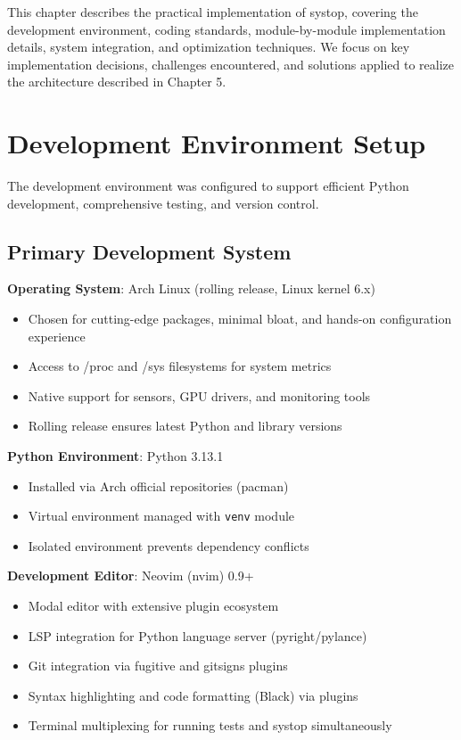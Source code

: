 \documentclass[12pt,a4paper,oneside]{report}
\begin{document}
This chapter describes the practical implementation of systop, covering the development environment, coding standards, module-by-module implementation details, system integration, and optimization techniques. We focus on key implementation decisions, challenges encountered, and solutions applied to realize the architecture described in Chapter 5.

\section{Development Environment Setup}
\label{sec:dev-environment}

The development environment was configured to support efficient Python development, comprehensive testing, and version control.

\subsection{Primary Development System}

\textbf{Operating System}: Arch Linux (rolling release, Linux kernel 6.x)
\begin{itemize}
    \item Chosen for cutting-edge packages, minimal bloat, and hands-on configuration experience
    \item Access to /proc and /sys filesystems for system metrics
    \item Native support for sensors, GPU drivers, and monitoring tools
    \item Rolling release ensures latest Python and library versions
\end{itemize}

\textbf{Python Environment}: Python 3.13.1
\begin{itemize}
    \item Installed via Arch official repositories (pacman)
    \item Virtual environment managed with \texttt{venv} module
    \item Isolated environment prevents dependency conflicts
\end{itemize}

\textbf{Development Editor}: Neovim (nvim) 0.9+
\begin{itemize}
    \item Modal editor with extensive plugin ecosystem
    \item LSP integration for Python language server (pyright/pylance)
    \item Git integration via fugitive and gitsigns plugins
    \item Syntax highlighting and code formatting (Black) via plugins
    \item Terminal multiplexing for running tests and systop simultaneously
\end{itemize}
\end{document}
